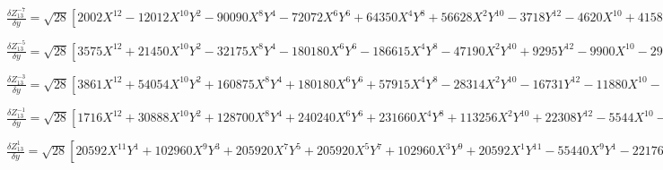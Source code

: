 \documentclass[10pt,landscape]{article}
\begin{document}
\vspace{1.2 mm}
\noindent $ \frac{\delta Z^{-7}_{13}}{\delta y} = \sqrt{28} [2002X^{12} -12012X^{10}Y^{2} -90090X^{8}Y^{4} -72072X^{6}Y^{6} +64350X^{4}Y^{8} +56628X^{2}Y^{10} -3718Y^{12} -4620X^{10} +41580X^{8}Y^{2} +138600X^{6}Y^{4} -27720X^{4}Y^{6} -112860X^{2}Y^{8} +7260Y^{10} +3465X^{8} -41580X^{6}Y^{2} -34650X^{4}Y^{4} +69300X^{2}Y^{6} -4455Y^{8} -840X^{6} +12600X^{4}Y^{2} -12600X^{2}Y^{4} +840Y^{6}] $

\vspace{1.2 mm}
\noindent $ \frac{\delta Z^{-5}_{13}}{\delta y} = \sqrt{28} [3575X^{12} +21450X^{10}Y^{2} -32175X^{8}Y^{4} -180180X^{6}Y^{6} -186615X^{4}Y^{8} -47190X^{2}Y^{10} +9295Y^{12} -9900X^{10} -29700X^{8}Y^{2} +138600X^{6}Y^{4} +304920X^{4}Y^{6} +124740X^{2}Y^{8} -21780Y^{10} +9900X^{8} -138600X^{4}Y^{4} -110880X^{2}Y^{6} +17820Y^{8} -4200X^{6} +12600X^{4}Y^{2} +37800X^{2}Y^{4} -5880Y^{6} +630X^{4} -3780X^{2}Y^{2} +630Y^{4}] $

\vspace{1.2 mm}
\noindent $ \frac{\delta Z^{-3}_{13}}{\delta y} = \sqrt{28} [3861X^{12} +54054X^{10}Y^{2} +160875X^{8}Y^{4} +180180X^{6}Y^{6} +57915X^{4}Y^{8} -28314X^{2}Y^{10} -16731Y^{12} -11880X^{10} -130680X^{8}Y^{2} -277200X^{6}Y^{4} -166320X^{4}Y^{6} +35640X^{2}Y^{8} +43560Y^{10} +13860X^{8} +110880X^{6}Y^{2} +138600X^{4}Y^{4} -41580Y^{8} -7560X^{6} -37800X^{4}Y^{2} -12600X^{2}Y^{4} +17640Y^{6} +1890X^{4} +3780X^{2}Y^{2} -3150Y^{4} -168X^{2} +168Y^{2}] $

\vspace{1.2 mm}
\noindent $ \frac{\delta Z^{-1}_{13}}{\delta y} = \sqrt{28} [1716X^{12} +30888X^{10}Y^{2} +128700X^{8}Y^{4} +240240X^{6}Y^{6} +231660X^{4}Y^{8} +113256X^{2}Y^{10} +22308Y^{12} -5544X^{10} -83160X^{8}Y^{2} -277200X^{6}Y^{4} -388080X^{4}Y^{6} -249480X^{2}Y^{8} -60984Y^{10} +6930X^{8} +83160X^{6}Y^{2} +207900X^{4}Y^{4} +194040X^{2}Y^{6} +62370Y^{8} -4200X^{6} -37800X^{4}Y^{2} -63000X^{2}Y^{4} -29400Y^{6} +1260X^{4} +7560X^{2}Y^{2} +6300Y^{4} -168X^{2} -504Y^{2} +7] $

\vspace{1.2 mm}
\noindent $ \frac{\delta Z^{1}_{13}}{\delta y} = \sqrt{28} [20592X^{11}Y^{1} +102960X^{9}Y^{3} +205920X^{7}Y^{5} +205920X^{5}Y^{7} +102960X^{3}Y^{9} +20592X^{1}Y^{11} -55440X^{9}Y^{1} -221760X^{7}Y^{3} -332640X^{5}Y^{5} -221760X^{3}Y^{7} -55440X^{1}Y^{9} +55440X^{7}Y^{1} +166320X^{5}Y^{3} +166320X^{3}Y^{5} +55440X^{1}Y^{7} -25200X^{5}Y^{1} -50400X^{3}Y^{3} -25200X^{1}Y^{5} +5040X^{3}Y^{1} +5040X^{1}Y^{3} -336X^{1}Y^{1}] $
\end{document}
